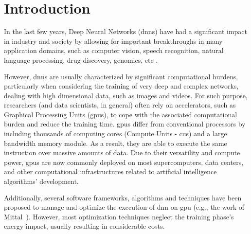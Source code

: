 
\chapter{Introduction}
\label{chapter:introduction}

In the last few years, Deep Neural Networks (\acrshort{dnn}s) have had a significant impact in industry and society by allowing for important breakthroughs in many application domains, such as computer vision, speech recognition, natural language processing, drug discovery, genomics, etc \cite{shrestha_review_2019}.

However, \acrshort{dnn}s are usually characterized by significant computational burdens, particularly when considering the training of very deep and complex networks, dealing with high dimensional data, such as images and videos. For such purpose, researchers (and data scientists, in general) often rely on accelerators, such as Graphical Processing Units (\acrshort{gpu}s), to cope with the associated computational burden and reduce the training time. \acrshort{gpu}s differ from conventional processors by including thousands of computing cores (Compute Units - \acrshort{cu}s) and a large bandwidth memory module. As a result, they are able to execute the same instruction over massive amounts of data. Due to their versatility and compute power, \acrshort{gpu}s are now commonly deployed on most supercomputers, data centers, and other computational infrastructures related to artificial intelligence algorithms' development.



Additionally, several software frameworks, algorithms and techniques have been proposed to manage and optimize the execution of \acrshort{dnn} on \acrshort{gpu} (e.g., the work of Mittal~\cite{mittal_survey_2019}). However, most optimization techniques neglect the training phase's energy impact, usually resulting in considerable costs. 

